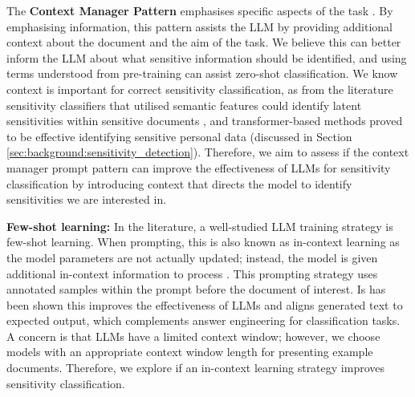 The \textbf{Context Manager Pattern} emphasises specific aspects of the task \cite{white2023prompt}. By emphasising information, this pattern assists the LLM by providing additional context about the document and the aim of the task. We believe this can better inform the LLM about what sensitive information should be identified, and using terms understood from pre-training can assist zero-shot classification. We know context is important for correct sensitivity classification, as from the literature sensitivity classifiers that utilised semantic features could identify latent sensitivities within sensitive documents \cite{mcdonald2017enhancing}, and transformer-based methods proved to be effective identifying sensitive personal data \cite{gambarelli2023your} (discussed in Section \ref{sec:background:sensitivity_detection}). Therefore, we aim to assess if the context manager prompt pattern can improve the effectiveness of LLMs for sensitivity classification by introducing context that directs the model to identify sensitivities we are interested in.

\textbf{Few-shot learning:}
In the literature, a well-studied LLM training strategy is few-shot learning. When prompting, this is also known as in-context learning as the model parameters are not actually updated; instead, the model is given additional in-context information to process \cite{gao2020making, brown2020language}. This prompting strategy uses annotated samples within the prompt before the document of interest. Is has been shown this improves the effectiveness of LLMs and aligns generated text to expected output, which complements answer engineering for classification tasks. A concern is that LLMs have a limited context window; however, we choose models with an appropriate context window length for presenting example documents. Therefore, we explore if an in-context learning strategy improves sensitivity classification.

